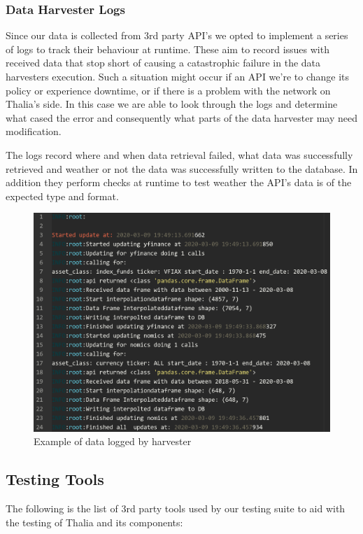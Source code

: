 \documentclass[main.tex]{subfiles}
\begin{document}
\subsubsection{Data Harvester Logs}
Since our data is collected from 3rd party API's we opted to implement a series of logs to track their behaviour at runtime. These aim to record issues with received data that stop short of causing a catastrophic failure in the data harvesters execution. Such a situation might occur if an API we're to change its policy or experience downtime, or if there is a problem with the network on Thalia's side. In this case we are able to look through the logs and determine what cased the error and consequently what parts of the data harvester may need modification.

The logs record where and when data retrieval failed, what data was successfully retrieved and weather or not the data was successfully written to the database. In addition they perform checks at runtime to test weather the API's data is of the expected type and format.

\begin{figure}[H]
   \centering
   \includegraphics[scale=0.3]{06Testing/06Pictures/harversterLogEx.png}
   \caption{Example of data logged by harvester}
   \label{Example log}
\end{figure}

\subsection{Testing Tools}
The following is the list of 3rd party tools used by our testing suite to aid with the testing of Thalia and its components:
\end{document}
